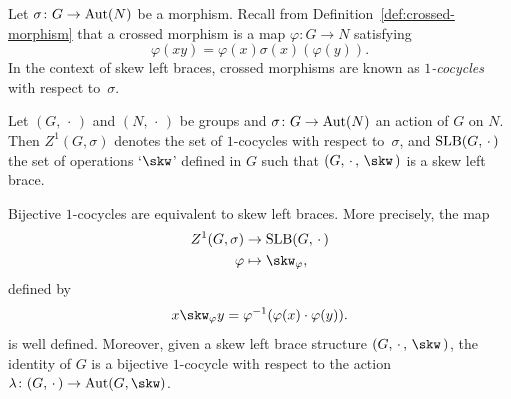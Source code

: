 \begin{defn}\label{def:1-cocycle}
    Let $\sigma\colon G\to{\rm Aut}(N)$ be a morphism. Recall from Definition~\ref{def:crossed-morphism} that a crossed morphism is a map $\varphi\colon G\to N$ satisfying
    $$
        \varphi(xy)=\varphi(x)\sigma(x)(\varphi(y)).
    $$
    In the context of skew left braces, crossed morphisms are known as \textsl{$1$-cocycles} with respect to~$\sigma$.
\end{defn}

\begin{ntn}
    Let\/ $(G,\,\cdot\,)$ and\/ $(N,\,\cdot\,)$ be groups and\/ $\sigma\colon G\to{\rm Aut}(N)$ an action of\/ $G$ on\/ $N$. Then\/ $Z^1(G,\sigma)$ denotes the set of\/ $1$-cocycles with respect to\/~$\sigma$, and\/ $\operatorname{SLB}(G,\,\cdot\,)$ the set of operations {\upshape `$\skw$'} defined in\/ $G$ such that\/ $(G,\,\cdot\,,\,\skw\,)$ is a skew left brace.
\end{ntn}

\begin{thm}
    Bijective\/ $1$-cocycles are equivalent to skew left braces. More precisely, the map
    \begin{align*}
        Z^1(G,\sigma)&\to\op{SLB}(G,\,\cdot\,)\\
        \varphi &\mapsto \skw_\varphi,
    \end{align*}
    defined by
    $$
        x\skw_\varphi y=\varphi^{-1}(\varphi(x)\cdot\varphi(y)).
    $$
    is well defined. Moreover, given a skew left brace structure\/ $(G,\,\cdot\,,\,\skw\,)$, the identity of\/ $G$ is a bijective\/ $1$-cocycle with respect to the action\/ $\lambda\colon(G,\,\cdot\,)\to\Aut(G,\skw)$.
\end{thm}

